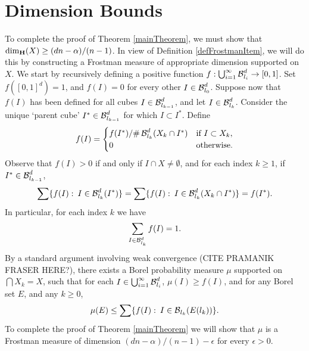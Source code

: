 \section{Dimension Bounds}\label{dimensionsection}

To complete the proof of Theorem \ref{mainTheorem}, we must show that $\operatorname{\dim_{\mathbf{H}}}(X) \geq (dn - \alpha)/(n - 1)$. In view of Definition \ref{defFrostmanItem}, we will do this by constructing a Frostman measure of appropriate dimension supported on $X$. We start by recursively defining a positive function $f: \bigcup_{i = 1}^\infty \operatorname{\mathcal{B}}^d_{l_i} \to [0,1]$. Set $f([0,1]^d) = 1$, and $f(I) = 0$ for every other $I \in \operatorname{\mathcal{B}}^d_{l_0}$. Suppose now that $f(I)$ has been defined for all cubes $I \in \operatorname{\mathcal{B}}^d_{l_{k-1}}$, and let $I \in \operatorname{\mathcal{B}}^d_{l_k}$. Consider the unique `parent cube' $I^* \in \operatorname{\mathcal{B}}^d_{l_{k-1}}$ for which $I \subset I^*$. Define
%
\begin{equation} \label{muRecurse}
	f(I) = \begin{cases} {f(I^*)}/{\# \operatorname{\mathcal{B}}^d_{l_k}(X_k \cap I^*)} & \textrm{if}\ I \subset X_k,\\
0 & \textrm{otherwise}. \end{cases}
\end{equation}
%
Observe that $f(I) > 0$ if and only if $I \cap X \neq \emptyset$, and for each index $k \geq 1$, if $I^* \in \operatorname{\mathcal{B}}_{l_{k-1}}^d$, 
%
\begin{equation}\label{muBreakDown}
	\sum \{ f(I) \operatorname{\colon} I \in \operatorname{\mathcal{B}}_{l_k}^d(I^*) \} = \sum \{ f(I) \operatorname{\colon} I \in \operatorname{\mathcal{B}}_{l_k}^d(X_k\cap I^*) \} = f(I^*).
\end{equation}
%
In particular, for each index $k$ we have
%
\[ \sum_{I \in \operatorname{\mathcal{B}}_{l_k}^d} f(I)=1. \]
By a standard argument involving weak convergence (CITE PRAMANIK FRASER HERE?), there exists a Borel probability measure $\mu$ supported on $\bigcap X_k = X$, such that for each $I \in \bigcup_{i = 1}^\infty \operatorname{\mathcal{B}}^d_{l_i}$, $\mu(I) \geq f(I)$, and for any Borel set $E$, and any $k \geq 0$,
%
\begin{equation} \label{BorelConstructionProperty}
	\mu(E) \leq \sum \{ f(I) \operatorname{\colon} I \in \operatorname{\mathcal{B}}_{l_k}(E(l_k)) \}.
\end{equation}
%
To complete the proof of Theorem \ref{mainTheorem} we will show that $\mu$ is a Frostman measure of dimension $(dn - \alpha)/(n - 1)-\epsilon$ for every $\epsilon>0$. 

